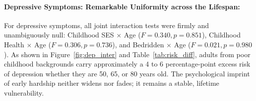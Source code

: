 \begin{table}[!htbp]
\centering
\small
\caption{\textbf{Joint Wald $\mathbf{F}$ Tests for Age-Group Interactions ($\mathbf{\text{Exposure} \times \text{Age Group}}$).}}
\label{tab:joint_test}
\end{table}

\paragraph{Depressive Symptoms: Remarkable Uniformity across the Lifespan:}
For depressive symptoms, all joint interaction tests were firmly and unambiguously null: Childhood SES $\times$ Age ($F = 0.340, p = 0.851$), Childhood Health $\times$ Age ($F = 0.306, p = 0.736$), and Bedridden $\times$ Age ($F = 0.021, p = 0.980$). As shown in Figure~\ref{fig:dep_inter} and Table~\ref{tab:risk_diff}, adults from poor childhood backgrounds carry approximately a 4 to 6 percentage-point excess risk of depression whether they are 50, 65, or 80 years old. The psychological imprint of early hardship neither widens nor fades; it remains a stable, lifetime vulnerability.

